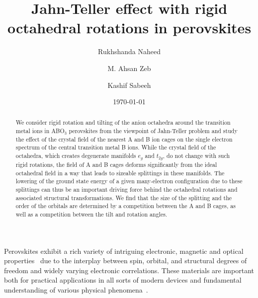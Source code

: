 \documentclass[a4paper,prb,twocolumn]{revtex4-1}  %
\begin{document}
\title{Jahn-Teller effect with rigid octahedral rotations in perovskites} %


\author{Rukhshanda Naheed}

\author{M. Ahsan Zeb}

\author{Kashif Sabeeh}


\date{\today}
\begin{abstract}

We consider
rigid rotation and tilting of the 
anion octahedra around the transition metal ions
 in ABO$_3$ perovskites
 from the viewpoint of Jahn-Teller problem
 and study the
effect of the crystal field of the nearest A and B ion cages 
on the single electron spectrum of the 
central 
transition metal B ions.
While the crystal field of the octahedra,
which
creates degenerate manifolds $e_g$ and $t_{2g}$,
do not change with such rigid rotations, 
the field of 
A and B cages
deforms significantly %
from the ideal octahedral field
in a way that
leads to sizeable splittings in 
these manifolds.
The lowering of the ground state energy
of a given many-electron configuration
due to these splittings
can thus be an important driving force behind the octahedral rotations 
and associated structural transformations.
We find that the size of the splitting and the 
order of the orbitals
are
determined by a competition between the A and B cages, 
as well as a competition between the tilt and rotation angles.

\end{abstract}
\maketitle


Perovskites  
exhibit a rich variety of intriguing 
electronic,
magnetic
 and optical
properties~\cite{ZubkoARCMP11,
HwangNM12, 
BhattacharyaARMR14,
HellmanRMP17,
ChenJPCM17,DagottoS05,DagottoMRSB08}
due to the interplay between
spin, orbital, and structural degrees of 
freedom
and widely varying electronic 
correlations.
These materials 
are important
both for practical applications in all sorts of modern devices 
and 
fundamental understanding of various physical 
phenomena~\cite{SalamonRMP01,
WangS03,
DawberRMP05,
SchlomARMR07,
KosterRMP12}.
\end{document}
